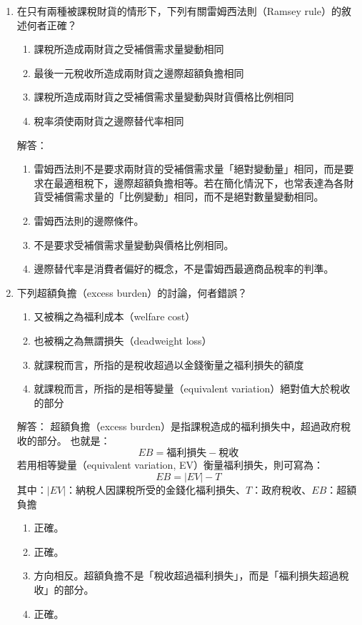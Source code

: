 \documentclass[12pt, a4paper]{article}
\begin{document}
\begin{enumerate}
    \item 在只有兩種被課稅財貨的情形下，下列有關雷姆西法則（Ramsey rule）的敘述何者正確？
    \begin{enumerate}[label=\Alph*.]
        \item 課稅所造成兩財貨之受補償需求量變動相同
        \item 最後一元稅收所造成兩財貨之邊際超額負擔相同
        \item 課稅所造成兩財貨之受補償需求量變動與財貨價格比例相同
        \item 稅率須使兩財貨之邊際替代率相同
    \end{enumerate}
    解答：
    \begin{enumerate}[label=\Alph*.]
        \item 雷姆西法則不是要求兩財貨的受補償需求量「絕對變動量」相同，而是要求在最適租稅下，邊際超額負擔相等。若在簡化情況下，也常表達為各財貨受補償需求量的「比例變動」相同，而不是絕對數量變動相同。
        \item 雷姆西法則的邊際條件。
        \item 不是要求受補償需求量變動與價格比例相同。
        \item 邊際替代率是消費者偏好的概念，不是雷姆西最適商品稅率的判準。
    \end{enumerate}

    \item 下列超額負擔（excess burden）的討論，何者錯誤？
    \begin{enumerate}[label=\Alph*.]
        \item 又被稱之為福利成本（welfare cost）
        \item 也被稱之為無謂損失（deadweight loss）
        \item 就課稅而言，所指的是稅收超過以金錢衡量之福利損失的額度
        \item 就課稅而言，所指的是相等變量（equivalent variation）絕對值大於稅收的部分
    \end{enumerate}
    解答：
    超額負擔（excess burden）是指課稅造成的福利損失中，超過政府稅收的部分。
    也就是：
    \[
    EB = \text{福利損失} - \text{稅收}
    \]
    若用相等變量（equivalent variation, EV）衡量福利損失，則可寫為：
    \[
    EB = |EV| - T
    \]
    其中：\(|EV|\)：納稅人因課稅所受的金錢化福利損失、\(T\)：政府稅收、\(EB\)：超額負擔
    \begin{enumerate}[label=\Alph*.]
        \item 正確。
        \item 正確。
        \item 方向相反。超額負擔不是「稅收超過福利損失」，而是「福利損失超過稅收」的部分。
        \item 正確。
    \end{enumerate}


\end{enumerate}
\end{document}
